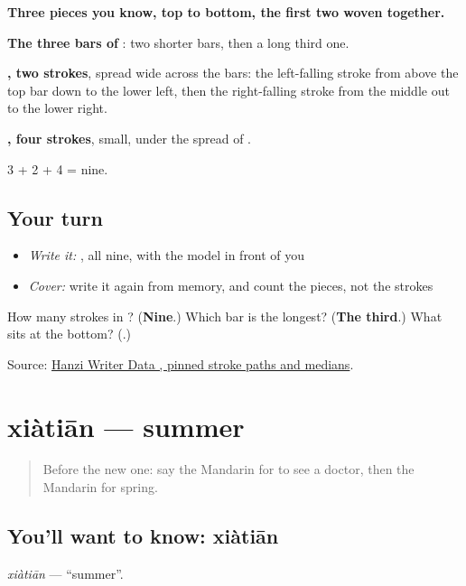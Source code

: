 \begin{quote}
\end{quote}

\textbf{Three pieces you know, top to bottom, the first two woven together.}

\textbf{The three bars of }: two shorter bars, then a long third one.

\textbf{, two strokes}, spread wide across the bars: the left-falling stroke from above the top bar down to the lower left, then the right-falling stroke from the middle out to the lower right.

\textbf{, four strokes}, small, under the spread of .

3 + 2 + 4 = nine.

\subsection*{Your turn}
\begin{itemize}
\raggedright
  \item \emph{Write it:} , all nine, with the model in front of you
  \item \emph{Cover:} write it again from memory, and count the pieces, not the strokes
\end{itemize}

\begin{tcolorbox}[breakable,colback=teal!4,colframe=teal!35!black,title={Before you move on}]
How many strokes in ? (\textbf{Nine}.) Which bar is the longest? (\textbf{The third}.) What sits at the bottom? (\textbf{}.)

Source: \href{https://raw.githubusercontent.com/chanind/hanzi-writer-data/68d10a4b21150cae5e1ebbd223eed289cf32d90c/data/\%E6\%98\%A5.json}{Hanzi Writer Data , pinned stroke paths and medians}.
\end{tcolorbox}
\section[xiàtiān]{xiàtiān — summer}

\label{lesson:ZH-C131-xiatian}



\begin{quote}
Before the new one: say the Mandarin for to see a doctor, then the Mandarin for spring.
\end{quote}

\subsection*{You'll want to know: xiàtiān}
\emph{xiàtiān} — \textquotedblleft{}summer\textquotedblright{}.

